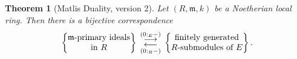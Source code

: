 \documentclass[10pt]{article}
\theoremstyle{thmstyle}
\newtheorem{theorem}{Theorem}[section]
\theoremstyle{defstyle}
\newcommand{\frakm}{\mathfrak{m}} %
\begin{document}
\begin{theorem}[Matlis Duality, version 2]
    Let $(R,\frakm,k)$ be a Noetherian local ring. Then there is a bijective correspondence
    \begin{equation*}
        \left\{
        \begin{tabular}{@{} c @{}}
            $\frakm$-primary ideals\\
            in $R$ 
        \end{tabular}
        \right\}
        \;
        \begin{gathered}
            \overset{\left(0 :_E -\right)}{\longrightarrow}\\[-2ex]
            \underset{\left(0 :_R -\right)}{\longleftarrow}
        \end{gathered}
        \;
        \left\{
        \begin{tabular}{@{} c @{}}
            finitely generated\\
            $R$-submodules of $E$
        \end{tabular}
        \right\}.
    \end{equation*}
\end{theorem}
\end{document}
